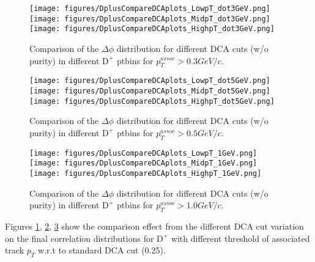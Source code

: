 \newpage
\begin{figure}[h]
\centering
{\texttt{[image: figures/DplusCompareDCAplots\_LowpT\_dot3GeV.png]}}
{\texttt{[image: figures/DplusCompareDCAplots\_MidpT\_dot3GeV.png]}}
{\texttt{[image: figures/DplusCompareDCAplots\_HighpT\_dot3GeV.png]}}
 \caption{Comparison of the $\Delta\phi$ distribution for different DCA cuts (w/o purity) in different $\text{D}^+$ ptbins for $p_{T}^{assoc}>0.3 GeV/c$. }
\label{fig:Syst_CDPlusDCAdot3GeV}
\end{figure}
\begin{figure}[h]
\centering
{\texttt{[image: figures/DplusCompareDCAplots\_LowpT\_dot5GeV.png]}}
{\texttt{[image: figures/DplusCompareDCAplots\_MidpT\_dot5GeV.png]}}
{\texttt{[image: figures/DplusCompareDCAplots\_HighpT\_dot5GeV.png]}}
 \caption{Comparison of the $\Delta\phi$ distribution for different DCA cuts (w/o purity) in different $\text{D}^+$ ptbins for $p_{T}^{assoc}>0.5 GeV/c$.}
\label{fig:Syst_CDPlusDCAdot5GeV}
\end{figure}
\begin{figure}[h]
\centering
{\texttt{[image: figures/DplusCompareDCAplots\_LowpT\_1GeV.png]}}
{\texttt{[image: figures/DplusCompareDCAplots\_MidpT\_1GeV.png]}}
{\texttt{[image: figures/DplusCompareDCAplots\_HighpT\_1GeV.png]}}
\caption{Comparison of the $\Delta\phi$ distribution for different DCA cuts (w/o purity) in different $\text{D}^+$ ptbins for $p_{T}^{assoc}>1.0 GeV/c$.}
\label{fig:Syst_CDPlusDCAt1GeV}
\end{figure}

Figures \ref{fig:Syst_CDPlusDCAdot3GeV}, \ref{fig:Syst_CDPlusDCAdot5GeV}, \ref{fig:Syst_CDPlusDCAt1GeV} show the comparison effect from the different DCA cut variation on the final correlation distributions for $\text{D}^+$ with different threshold of associated track $p_{T}$ w.r.t to standard DCA cut (0.25).



